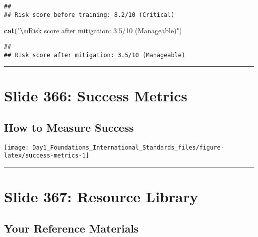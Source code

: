 \documentclass[
]{article}
\newenvironment{Shaded}{\begin{snugshade}}{\end{snugshade}}
\newcommand{\FunctionTok}[1]{\textcolor[rgb]{0.13,0.29,0.53}{\textbf{#1}}}
\newcommand{\NormalTok}[1]{#1}
\newcommand{\SpecialCharTok}[1]{\textcolor[rgb]{0.81,0.36,0.00}{\textbf{#1}}}
\newcommand{\StringTok}[1]{\textcolor[rgb]{0.31,0.60,0.02}{#1}}
\begin{document}
\begin{verbatim}
## 
## Risk score before training: 8.2/10 (Critical)
\end{verbatim}

\begin{Shaded}
\begin{Highlighting}[]
\FunctionTok{cat}\NormalTok{(}\StringTok{"}\SpecialCharTok{\textbackslash{}n}\StringTok{Risk score after mitigation: 3.5/10 (Manageable)"}\NormalTok{)}
\end{Highlighting}
\end{Shaded}

\begin{verbatim}
## 
## Risk score after mitigation: 3.5/10 (Manageable)
\end{verbatim}

\begin{center}\rule{0.5\linewidth}{0.5pt}\end{center}

\section{Slide 366: Success Metrics}\label{slide-366-success-metrics}

\subsection{How to Measure Success}\label{how-to-measure-success}

\texttt{[image: Day1\_Foundations\_International\_Standards\_files/figure-latex/success-metrics-1]}

\begin{center}\rule{0.5\linewidth}{0.5pt}\end{center}

\section{Slide 367: Resource Library}\label{slide-367-resource-library}

\subsection{Your Reference Materials}\label{your-reference-materials}
\end{document}
